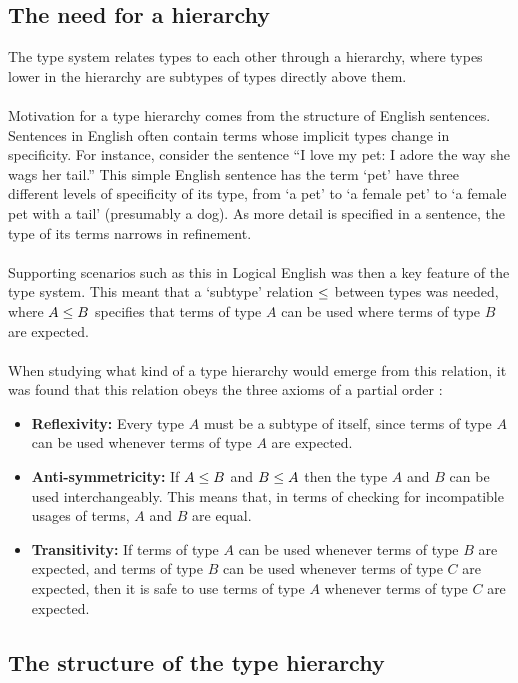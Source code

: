 \documentclass[../main.tex]{subfiles}
\begin{document}
\subsection{The need for a hierarchy}
The type system relates types to each other through a hierarchy, where types lower in the hierarchy are subtypes of types directly above them.
\\
\\
Motivation for a type hierarchy comes from the structure of English sentences. Sentences in English often contain terms whose implicit types change in specificity. 
For instance, consider the sentence ``I love my pet: I adore the way she wags her tail.'' This simple English sentence has the term `pet' have three different levels of specificity of its type, from `a pet' to `a female pet' to `a female pet with a tail' (presumably a dog). As more detail is specified in a sentence, the type of its terms narrows in refinement. 
\\
\\
Supporting scenarios such as this in Logical English was then a key feature of the type system. This meant that a `subtype' relation $\leq$ between types was needed, where $A \leq B$ specifies that terms of type $A$ can be used where terms of type $B$ are expected. 
\\
\\
When studying what kind of a type hierarchy would emerge from this relation, it was found that this relation obeys the three axioms of a partial order \cite{posets}:
\begin{itemize}
    \item \textbf{Reflexivity:} Every type $A$ must be a subtype of itself, since terms of type $A$ can be used whenever terms of type $A$ are expected.
    \item \textbf{Anti-symmetricity:} If $A \leq B$ and $B \leq A$ then the type $A$ and $B$ can be used interchangeably. This means that, in terms of checking for incompatible usages of terms, $A$ and $B$ are equal. 
    \item \textbf{Transitivity:} If terms of type $A$ can be used whenever terms of type $B$ are expected, and terms of type $B$ can be used whenever terms of type $C$ are expected, then it is safe to use terms of type $A$ whenever terms of type $C$ are expected.
\end{itemize}

\subsection{The structure of the type hierarchy}
\end{document}
